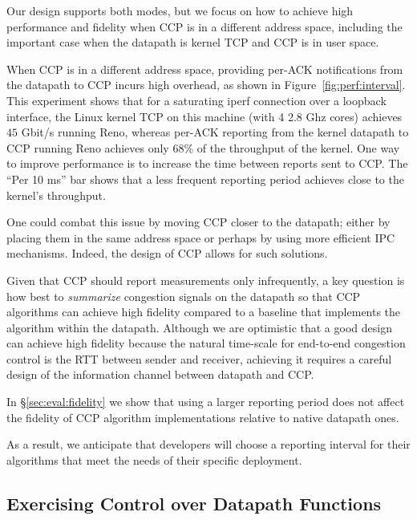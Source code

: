\smallskip

Our design supports both modes, but we focus on how to achieve high performance and fidelity when CCP is in a different address space, including the important case when the datapath is kernel TCP and CCP is in user space.

When CCP is in a different address space, providing per-ACK notifications from the datapath to CCP incurs high overhead, as shown in Figure~\ref{fig:perf:interval}. This experiment shows that for a saturating iperf connection over a loopback interface, the Linux kernel TCP on this machine  (with 4 2.8 Ghz cores) achieves $45$ Gbit/s running Reno, whereas per-ACK reporting from the kernel datapath to CCP running Reno achieves only 68\% of the throughput of the kernel. 
One way to improve performance is to increase the time between reports sent to CCP. The ``Per 10 ms'' bar shows that a less frequent reporting period achieves close to the kernel's throughput. 

One could combat this issue by moving CCP closer to the datapath; \ie either by placing them in the same address space or perhaps by using more efficient IPC mechanisms. Indeed, the design of CCP allows for such solutions. 

\fi

Given that CCP should report measurements only infrequently, a key question is how best to {\em summarize} congestion signals on the datapath so that CCP algorithms can achieve high fidelity compared to a baseline that implements the algorithm within the datapath. 
Although we are optimistic that a good design can achieve high fidelity because the natural time-scale for end-to-end congestion control is the RTT between sender and receiver, achieving it requires a careful design of the information channel between datapath and CCP. 

In \S\ref{sec:eval:fidelity} we show that using a larger reporting period does not affect the fidelity of CCP algorithm implementations relative to native datapath ones. 

As a result, we anticipate that developers will choose a reporting interval for their algorithms that meet the needs of their specific deployment. 
\fi

\subsection{Exercising Control over Datapath Functions}

